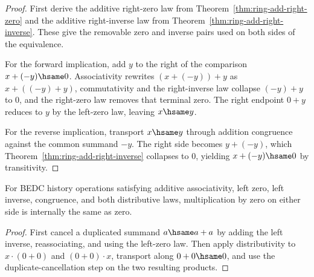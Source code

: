 \begin{proof}
First derive the additive right-zero law from
Theorem~\ref{thm:ring-add-right-zero} and the additive right-inverse law from
Theorem~\ref{thm:ring-add-right-inverse}. These give the removable zero and
inverse pairs used on both sides of the equivalence.

For the forward implication, add $y$ to the right of the comparison
$x+(-y)\hsame0$. Associativity rewrites $(x+(-y))+y$ as $x+((-y)+y)$,
commutativity and the right-inverse law collapse $(-y)+y$ to $0$, and the
right-zero law removes that terminal zero. The right endpoint $0+y$ reduces to
$y$ by the left-zero law, leaving $x\hsame y$.

For the reverse implication, transport $x\hsame y$ through addition congruence
against the common summand $-y$. The right side becomes $y+(-y)$, which
Theorem~\ref{thm:ring-add-right-inverse} collapses to $0$, yielding
$x+(-y)\hsame0$ by transitivity.
\end{proof}

\begin{theorem}
\label{thm:ring-mul-zero-absorption}
For BEDC history operations satisfying additive associativity, left zero,
left inverse, congruence, and both distributive laws, multiplication by zero on
either side is internally the same as zero.
\end{theorem}
\begin{proof}
First cancel a duplicated summand \(a\hsame a+a\) by adding the left inverse,
reassociating, and using the left-zero law. Then apply distributivity to
\(x\cdot(0+0)\) and \((0+0)\cdot x\), transport along \(0+0\hsame0\), and use
the duplicate-cancellation step on the two resulting products.
\end{proof}

